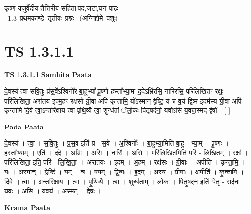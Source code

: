 \documentclass[17pt]{extarticle}
\begin{document}
\begin{titlepage}
    \begin{center}
 
\begin{sanskrit}
    { \Huge
    कृष्ण यजुर्वेदीय तैत्तिरीय संहिता,पद,जटा,घन पाठः 
    }
    \\
    \vspace{2.5cm}
    \mbox{ \Huge
    1.3     प्रथमकाण्डे तृतीयः प्रश्नः -(अग्निष्टोमे पशुः)   }
\end{sanskrit}
\end{center}

\end{titlepage}
\tableofcontents
\pagebreak

\section*{ TS 1.3.1.1 }

\textbf{TS 1.3.1.1 } \newline
\textbf{Samhita Paata} \newline

दे॒वस्य॑ त्वा सवि॒तुः प्र॑स॒वे᳚ऽश्विनो᳚र् बा॒हुभ्यां᳚ पू॒ष्णो हस्ता᳚भ्या॒मा द॒देऽभ्रि॑रसि॒ नारि॑रसि॒ परि॑लिखितꣳ॒॒ रक्षः॒ परि॑लिखिता॒ अरा॑तय इ॒दम॒हꣳ रक्ष॑सो ग्री॒वा अपि॑ कृन्तामि॒ यो᳚ऽस्मान् द्वेष्टि॒ यं च॑ व॒यं द्वि॒ष्म इ॒दम॑स्य ग्री॒वा अपि॑ कृन्तामि दि॒वे त्वा॒ऽन्तरि॑क्षाय त्वा पृथि॒व्यै त्वा॒ शुन्ध॑तां ॅलो॒कः पि॑तृ॒षद॑नो॒ यवो॑ऽसि य॒वया॒स्मद् द्वेषो॑ - [ ] \newline

\textbf{Pada Paata} \newline

दे॒वस्य॑ । त्वा॒ । स॒वि॒तुः । प्र॒स॒व इति॑ प्र - स॒वे । अ॒श्विनोः᳚ । बा॒हुभ्या॒मिति॑ बा॒हु - भ्या॒म् । पू॒ष्णः । हस्ता᳚भ्याम् । एति॑ । द॒दे॒ । अभ्रिः॑ । अ॒सि॒ । नारिः॑ । अ॒सि॒ । परि॑लिखित॒मिति॒ परि॑ - लि॒खि॒त॒म् । रक्षः॑ । परि॑लिखिता॒ इति॒ परि॑ - लि॒खि॒ताः॒ । अरा॑तयः । इ॒दम् । अ॒हम् । रक्ष॑सः । ग्री॒वाः । अपीति॑ । कृ॒न्ता॒मि॒ । यः । अ॒स्मान् । द्वेष्टि॑ । यम् । च॒ । व॒यम् । द्वि॒ष्मः । इ॒दम् । अ॒स्य॒ । ग्री॒वाः । अपीति॑ । कृ॒न्ता॒मि॒ । दि॒वे । त्वा॒ । अ॒न्तरि॑क्षाय । त्वा॒ । पृ॒थि॒व्यै । त्वा॒ । शुन्ध॑ताम् । लो॒कः । पि॒तृ॒षद॑न॒ इति॑ पितृ - सद॑नः । यवः॑ । अ॒सि॒ । य॒वय॑ । अ॒स्मत् । द्वेषः॑ ।  \newline


\textbf{Krama Paata} \newline
\end{document}
